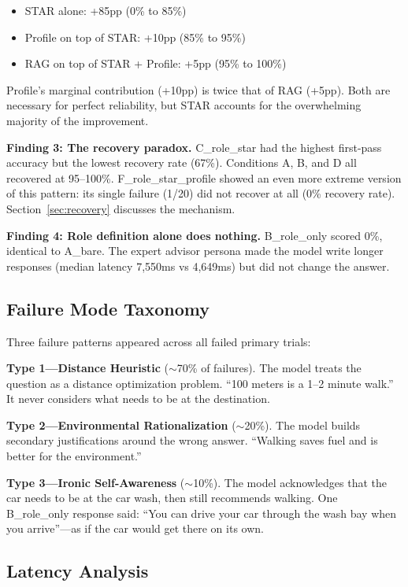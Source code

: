 \documentclass[11pt]{article}
\begin{document}
\begin{itemize}[leftmargin=2em]
\item STAR alone: +85pp (0\% to 85\%)
\item Profile on top of STAR: +10pp (85\% to 95\%)
\item RAG on top of STAR + Profile: +5pp (95\% to 100\%)
\end{itemize}

Profile's marginal contribution (+10pp) is twice that of RAG (+5pp). Both are necessary for perfect reliability, but STAR accounts for the overwhelming majority of the improvement.

\textbf{Finding 3: The recovery paradox.} C\_role\_star had the highest first-pass accuracy but the lowest recovery rate (67\%). Conditions A, B, and D all recovered at 95--100\%. F\_role\_star\_profile showed an even more extreme version of this pattern: its single failure (1/20) did not recover at all (0\% recovery rate). Section~\ref{sec:recovery} discusses the mechanism.

\textbf{Finding 4: Role definition alone does nothing.} B\_role\_only scored 0\%, identical to A\_bare. The expert advisor persona made the model write longer responses (median latency 7,550ms vs 4,649ms) but did not change the answer.

\subsection{Failure Mode Taxonomy}

Three failure patterns appeared across all failed primary trials:

\textbf{Type 1---Distance Heuristic} ($\sim$70\% of failures). The model treats the question as a distance optimization problem. ``100 meters is a 1--2 minute walk.'' It never considers what needs to be at the destination.

\textbf{Type 2---Environmental Rationalization} ($\sim$20\%). The model builds secondary justifications around the wrong answer. ``Walking saves fuel and is better for the environment.''

\textbf{Type 3---Ironic Self-Awareness} ($\sim$10\%). The model acknowledges that the car needs to be at the car wash, then still recommends walking. One B\_role\_only response said: ``You can drive your car through the wash bay when you arrive''---as if the car would get there on its own.

\subsection{Latency Analysis}
\end{document}
